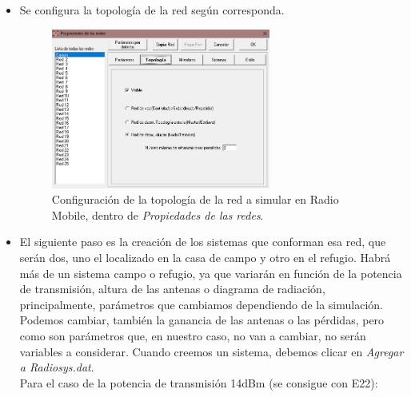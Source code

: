 \documentclass[12pt]{article}
\begin{document}
\begin{itemize}
		\pagebreak
		
		\item Se configura la topología de la red según corresponda.
		
		
		\begin{figure}[h!]
			\begin{center}
				\includegraphics[width=0.68\textwidth]{img/propRedes_topo_RadioMobile.png}
				\caption{Configuración de la topología de la red a simular en Radio Mobile, dentro de \textit{Propiedades de las redes}.}
				\label{Prop redes topo radiomobile}
			\end{center}
		\end{figure}
		
		\pagebreak
		
		\item El siguiente paso es la creación de los sistemas que conforman esa red, que serán dos, uno el localizado en la casa de campo y otro en el refugio. Habrá más de un sistema campo o refugio, ya que variarán en función de la potencia de transmisión, altura de las antenas o diagrama de radiación, principalmente, parámetros que cambiamos dependiendo de la simulación. Podemos cambiar, también la ganancia de las antenas o las pérdidas, pero como son parámetros que, en nuestro caso, no van a cambiar, no serán variables a considerar. Cuando creemos un sistema, debemos clicar en \textit{Agregar a Radiosys.dat}. \\
		
		Para el caso de la potencia de transmisión 14dBm (se consigue con E22): \\
		
		

\end{itemize}
\end{document}
